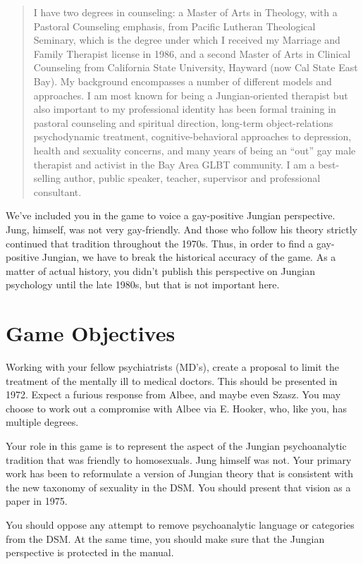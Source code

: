 \begin{refsection}
\begin{quote}
I have two degrees in counseling: a Master of Arts in Theology, with a Pastoral Counseling emphasis, from Pacific Lutheran Theological Seminary, which is the degree under which I received my Marriage and Family Therapist license in 1986, and a second Master of Arts in Clinical Counseling from California State University, Hayward (now Cal State East Bay). My background encompasses a number of different models and approaches. I am most known for being a Jungian-oriented therapist but also important to my professional identity has been formal training in pastoral counseling and spiritual direction, long-term object-relations psychodynamic treatment, cognitive-behavioral approaches to depression, health and sexuality concerns, and many years of being an ``out'' gay male therapist and activist in the Bay Area GLBT community. I am a best-selling author, public speaker, teacher, supervisor and professional consultant.
\end{quote}

We've included you in the game to voice a gay-positive Jungian perspective. Jung, himself, was not very gay-friendly. And those who follow his theory strictly continued that tradition throughout the 1970s. Thus, in order to find a gay-positive Jungian, we have to break the historical accuracy of the game. As a matter of actual history, you didn't publish this perspective on Jungian psychology until the late 1980s, but that is not important here.

\section{Game Objectives}
\label{gameobjectives}

Working with your fellow psychiatrists (MD's), create a proposal to limit the treatment of the mentally ill to medical doctors. This should be presented in 1972. Expect a furious response from Albee, and maybe even Szasz. You may choose to work out a compromise with Albee via E. Hooker, who, like you, has multiple degrees.

Your role in this game is to represent the aspect of the Jungian psychoanalytic tradition that was friendly to homosexuals. Jung himself was not. Your primary work has been to reformulate a version of Jungian theory that is consistent with the new taxonomy of sexuality in the DSM. You should present that vision as a paper in 1975.

You should oppose any attempt to remove psychoanalytic language or categories from the DSM. At the same time, you should make sure that the Jungian perspective is protected in the manual.


\end{refsection}
